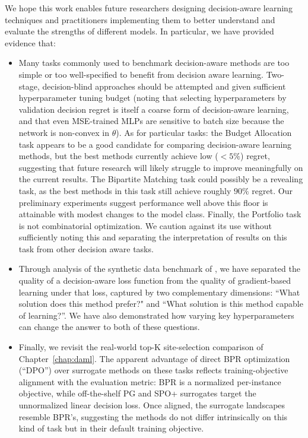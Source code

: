 We hope this work enables future researchers designing decision-aware learning techniques and practitioners implementing them to better understand and evaluate the strengths of different models.
In particular, we have provided evidence that:
\begin{itemize}
    \item Many tasks commonly used to benchmark decision-aware methods are too simple or too well-specified to benefit from decision aware learning. Two-stage, decision-blind approaches should be attempted and given sufficient hyperparameter tuning budget (noting that selecting hyperparameters by validation decision regret is itself a coarse form of decision-aware learning, and that even MSE-trained MLPs are sensitive to batch size because the network is non-convex in $\theta$). As for particular tasks: the Budget Allocation task appears to be a good candidate for comparing decision-aware learning methods, but the best methods currently achieve low ($<5\%$) regret, suggesting that future research will likely struggle to improve meaningfully on the current results. The Bipartite Matching task could possibly be a revealing task, as the best methods in this task still achieve roughly $90\%$ regret. Our preliminary experiments suggest performance well above this floor is attainable with modest changes to the model class. Finally, the Portfolio task is not combinatorial optimization. We caution against its use without sufficiently noting this and separating the interpretation of results on this task from other decision aware tasks.
    \item Through analysis of the synthetic data benchmark of \citeauthor{huang2024decisionfocusedPG}, we have separated the quality of a decision-aware loss function from the quality of gradient-based learning under that loss, captured by two complementary dimensions: ``What solution does this method prefer?" and ``What solution is this method capable of learning?''. We have also demonstrated how varying key hyperparameters can change the answer to both of these questions.
    \item Finally, we revisit the real-world top-K site-selection comparison of Chapter~\ref{chap:daml}. The apparent advantage of direct BPR optimization (``DPO'') over surrogate methods on these tasks reflects training-objective alignment with the evaluation metric: BPR is a normalized per-instance objective, while off-the-shelf PG and SPO+ surrogates target the unnormalized linear decision loss. Once aligned, the surrogate landscapes resemble BPR's, suggesting the methods do not differ intrinsically on this kind of task but in their default training objective.
\end{itemize}

